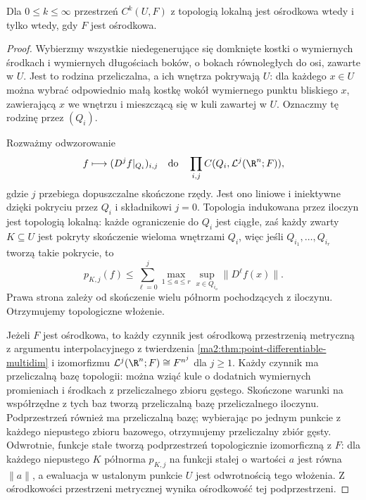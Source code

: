 \begin{twierdzenie}
\label{ma2:thm:ck-local-separable}
Dla $0\le k\le\infty$ przestrzeń $C^k(U,F)$
z topologią lokalną jest ośrodkowa wtedy
i tylko wtedy, gdy $F$ jest ośrodkowa.
\end{twierdzenie}
\begin{proof}
Wybierzmy wszystkie niedegenerujące się domknięte
kostki o wymiernych środkach i wymiernych
długościach boków, o bokach równoległych do osi,
zawarte w $U$. Jest to rodzina przeliczalna,
a ich wnętrza pokrywają $U$: dla każdego $x\in U$
można wybrać odpowiednio małą kostkę wokół
wymiernego punktu bliskiego $x$, zawierającą
$x$ we wnętrzu i mieszczącą się w kuli zawartej
w $U$. Oznaczmy tę rodzinę przez $(Q_i)$.

Rozważmy odwzorowanie
\[
 f\longmapsto (D^jf|_{Q_i})_{i,j}
 \quad\text{do}\quad
 \prod_{i,j} C(Q_i,\mathcal L^j(\R^n;F)),
\]
gdzie $j$ przebiega dopuszczalne skończone rzędy.
Jest ono liniowe i iniektywne dzięki pokryciu
przez $Q_i$ i składnikowi $j=0$.
Topologia indukowana przez iloczyn jest
topologią lokalną: każde ograniczenie do $Q_i$
jest ciągłe, zaś każdy zwarty $K\subseteq U$
jest pokryty skończenie wieloma wnętrzami $Q_i$,
więc jeśli $Q_{i_1},\ldots,Q_{i_r}$ tworzą
takie pokrycie, to
\[
 p_{K,j}(f)\le
 \sum_{\ell=0}^j\max_{1\le a\le r}
              \sup_{x\in Q_{i_a}}\|D^\ell f(x)\|.
\]
Prawa strona zależy od skończenie wielu
półnorm pochodzących z iloczynu.
Otrzymujemy topologiczne włożenie.

Jeżeli $F$ jest ośrodkowa, to każdy czynnik
jest ośrodkową przestrzenią metryczną
z argumentu interpolacyjnego z twierdzenia
\ref{ma2:thm:point-differentiable-multidim}
i izomorfizmu $\mathcal L^j(\R^n;F)\cong F^{n^j}$
dla $j\ge1$. Każdy czynnik ma przeliczalną bazę topologii:
można wziąć kule o dodatnich wymiernych promieniach
i środkach z przeliczalnego zbioru gęstego.
Skończone warunki na współrzędne z tych baz
tworzą przeliczalną bazę przeliczalnego iloczynu. Podprzestrzeń również
ma przeliczalną bazę; wybierając po jednym
punkcie z każdego niepustego zbioru bazowego,
otrzymujemy przeliczalny zbiór gęsty.
Odwrotnie, funkcje stałe tworzą podprzestrzeń
topologicznie izomorficzną z $F$: dla każdego
niepustego $K$ półnorma $p_{K,j}$ na funkcji
stałej o wartości $a$ jest równa $\|a\|$, a ewaluacja w ustalonym
punkcie $U$ jest odwrotnością tego włożenia.
Z ośrodkowości przestrzeni metrycznej wynika
ośrodkowość tej podprzestrzeni.
\end{proof}

